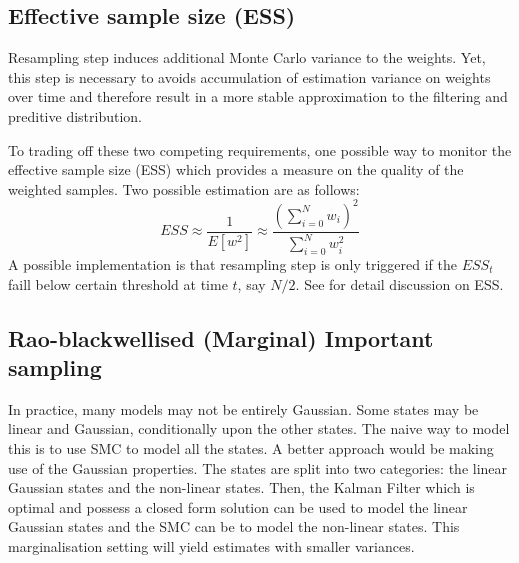 \subsection{Effective sample size (ESS)}
Resampling step induces additional Monte Carlo variance to the weights. Yet, this step is necessary to avoids accumulation of estimation variance on weights over time and therefore result in a more stable approximation to the filtering and preditive distribution.

To trading off these two competing requirements, one possible way to monitor the effective sample size (ESS) which provides a measure on the quality of the weighted samples. Two possible estimation are as follows:
\begin{equation}
  ESS \approx \dfrac{1}{E[w^2]} \approx \dfrac{\left(\sum^N_{i=0} w_i \right)^2}{\sum^N_{i=0}w_i^2}
\end{equation}
A possible implementation is that resampling step is only triggered if the $ESS_t$ faill below certain threshold at time $t$, say $N/2$. See \cite{} for detail discussion on ESS.

\subsection{Rao-blackwellised (Marginal) Important sampling}
In practice, many models may not be entirely Gaussian. Some states may be linear and Gaussian, conditionally upon the other states. The naive way to model this is to use SMC to model all the states. A better approach would be making use of the Gaussian properties. The states are split into two categories: the linear Gaussian states and the non-linear states. Then, the Kalman Filter which is optimal and possess a closed form solution can be used to model the linear Gaussian states and the SMC can be to model the non-linear states. This marginalisation setting will yield estimates with smaller variances. 

